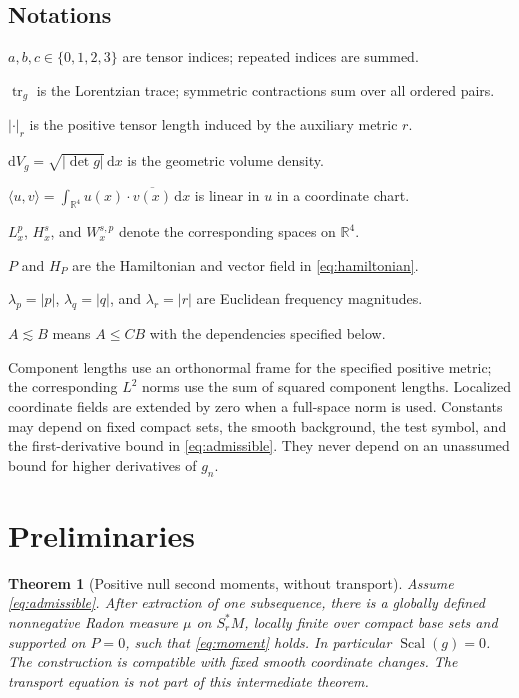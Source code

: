 \documentclass[11pt,a4paper]{article}
\numberwithin{equation}{section}
\newcommand{\Scal}{\operatorname{Scal}}
\newcommand{\tr}{\operatorname{tr}}
\newcommand{\dd}{\mathrm d}
\newcommand{\R}{\mathbb R}
\newcommand{\dV}{\dd V_g}
\newcommand{\ip}[2]{\langle #1,#2\rangle}
\newcommand{\ls}{\lesssim}
\newtheorem{theorem}{Theorem}[section]
\theoremstyle{definition}
\begin{document}
\begin{samepage}
\subsection{Notations}

\begin{description}[leftmargin=1.5em,labelsep=0.5em,itemsep=3pt]
\item[$\blacktriangleright$] $a,b,c\in\{0,1,2,3\}$ are tensor indices; repeated indices are summed.
\item[$\blacktriangleright$] $\tr_g$ is the Lorentzian trace; symmetric contractions sum over all ordered pairs.
\item[$\blacktriangleright$] $|\cdot|_r$ is the positive tensor length induced by the auxiliary metric $r$.
\item[$\blacktriangleright$] $\dV=\sqrt{|\det g|}\,\dd x$ is the geometric volume density.
\item[$\blacktriangleright$] $\ip{u}{v}=\int_{\R^4}u(x)\cdot\overline{v(x)}\,\dd x$ is linear in $u$ in a coordinate chart.
\item[$\blacktriangleright$] $L^p_x$, $H^s_x$, and $W^{s,p}_x$ denote the corresponding spaces on $\R^4$.
\item[$\blacktriangleright$] $P$ and $H_P$ are the Hamiltonian and vector field in \eqref{eq:hamiltonian}.
\item[$\blacktriangleright$] $\lambda_p=|p|$, $\lambda_q=|q|$, and $\lambda_r=|r|$ are Euclidean frequency magnitudes.
\item[$\blacktriangleright$] $A\ls B$ means $A\leq CB$ with the dependencies specified below.
\end{description}
\end{samepage}
Component lengths use an orthonormal frame for the specified positive metric;
the corresponding $L^2$ norms use the sum of squared component lengths.
Localized coordinate fields are extended by zero when a full-space norm is used.
Constants may depend on fixed compact sets, the smooth background,
the test symbol, and the first-derivative bound in \eqref{eq:admissible}.
They never depend on an unassumed bound for higher derivatives of $g_n$.

\section{Preliminaries}\label{sec:quadratic}

\begin{theorem}[Positive null second moments, without transport]\label{thm:quadratic}
Assume \eqref{eq:admissible}. After extraction of one subsequence, there is a globally defined nonnegative Radon measure $\mu$ on $S_r^*M$, locally finite over compact base sets and supported on $P=0$, such that \eqref{eq:moment} holds. In particular $\Scal(g)=0$. The construction is compatible with fixed smooth coordinate changes. The transport equation is not part of this intermediate theorem.
\end{theorem}
\end{document}
